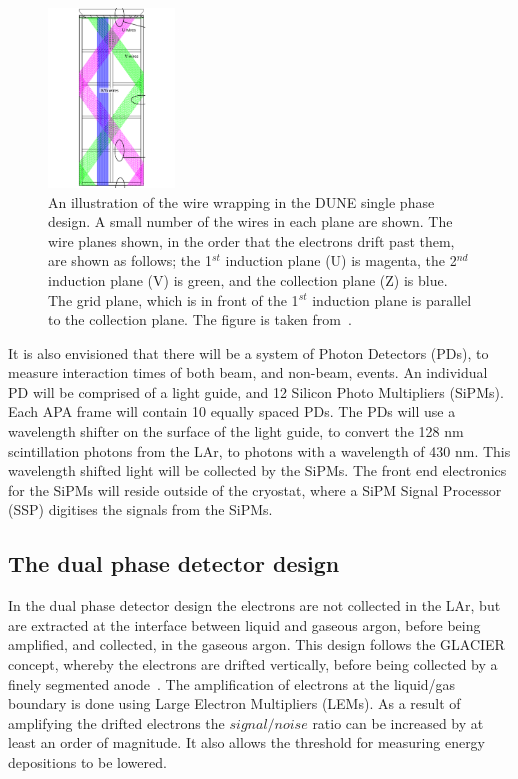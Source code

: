 \begin{figure}
  \centering
  \includegraphics[width=0.3\textwidth]{tpc_apa_cross_sections}
  \caption[An illustration of the wire wrapping in the DUNE single phase design]
          {An illustration of the wire wrapping in the DUNE single phase design. A small number of the wires in each plane are shown. The wire planes shown, in the order that the electrons drift past them, are shown as follows; the 1$^{st}$ induction plane (U) is magenta, the 2$^{nd}$ induction plane (V) is green, and the collection plane (Z) is blue. The grid plane, which is in front of the 1$^{st}$ induction plane is parallel to the collection plane. The figure is taken from~\citep{DUNECDR_V4}.}  
  \label{fig:35tonWireGeom}
\end{figure}

It is also envisioned that there will be a system of Photon Detectors (PDs), to measure interaction times of both beam, and non-beam, events. An individual PD will be comprised of a light guide, and 12 Silicon Photo Multipliers (SiPMs). Each APA frame will contain 10 equally spaced PDs. The PDs will use a wavelength shifter on the surface of the light guide, to convert the 128 nm scintillation photons from the LAr, to photons with a wavelength of 430 nm. This wavelength shifted light will be collected by the SiPMs. The front end electronics for the SiPMs will reside outside of the cryostat, where a SiPM Signal Processor (SSP) digitises the signals from the SiPMs. \\

\subsection{The dual phase detector design} \label{sec:DUNEDetector_DP}
In the dual phase detector design the electrons are not collected in the LAr, but are extracted at the interface between liquid and gaseous argon, before being amplified, and collected, in the gaseous argon. This design follows the GLACIER concept\citep{GLACIER}, whereby the electrons are drifted vertically, before being collected by a finely segmented anode~\citep{1748-0221-8-04-P04012, 1748-0221-7-08-P08026, Badertscher:2010zg}. The amplification of electrons at the liquid/gas boundary is done using Large Electron Multipliers (LEMs). As a result of amplifying the drifted electrons the $signal/noise$ ratio can be increased by at least an order of magnitude. It also allows the threshold for measuring energy depositions to be lowered. \\


